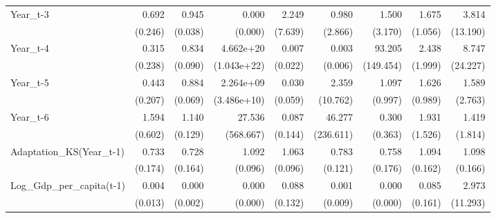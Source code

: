 \begin{table}[htbp]
\begin{tabular}{l*{8}{D{.}{.}{-1}}}
Year\_t-3    &       0.692         &       0.945         &       0.000\sym{**} &       2.249         &       0.980         &       1.500         &       1.675         &       3.814         \\
            &     (0.246)         &     (0.038)         &     (0.000)         &     (7.639)         &     (2.866)         &     (3.170)         &     (1.056)         &    (13.190)         \\
Year\_t-4    &       0.315\sym{\%}  &       0.834\sym{*}  &   4.662e+20\sym{**} &       0.007\sym{\%}  &       0.003\sym{**} &      93.205\sym{***}&       2.438         &       8.747         \\
            &     (0.238)         &     (0.090)         & (1.043e+22)         &     (0.022)         &     (0.006)         &   (149.454)         &     (1.999)         &    (24.227)         \\
Year\_t-5    &       0.443\sym{*}  &       0.884\sym{\%}  &   2.264e+09         &       0.030\sym{*}  &       2.359         &       1.097         &       1.626         &       1.589         \\
            &     (0.207)         &     (0.069)         & (3.486e+10)         &     (0.059)         &    (10.762)         &     (0.997)         &     (0.989)         &     (2.763)         \\
Year\_t-6    &       1.594         &       1.140         &      27.536         &       0.087\sym{\%}  &      46.277         &       0.300         &       1.931         &       1.419         \\
            &     (0.602)         &     (0.129)         &   (568.667)         &     (0.144)         &   (236.611)         &     (0.363)         &     (1.526)         &     (1.814)         \\
Adaptation\_KS(Year\_t-1)&       0.733         &       0.728         &       1.092         &       1.063         &       0.783\sym{\%}  &       0.758         &       1.094         &       1.098         \\
            &     (0.174)         &     (0.164)         &     (0.096)         &     (0.096)         &     (0.121)         &     (0.176)         &     (0.162)         &     (0.166)         \\
Log\_Gdp\_per\_capita(t-1)&       0.004\sym{\%}  &       0.000\sym{*}  &       0.000\sym{***}&       0.088\sym{\%}  &       0.001         &       0.000\sym{***}&       0.085         &       2.973         \\
            &     (0.013)         &     (0.002)         &     (0.000)         &     (0.132)         &     (0.009)         &     (0.000)         &     (0.161)         &    (11.293)         \\

\end{tabular}
\end{table}
